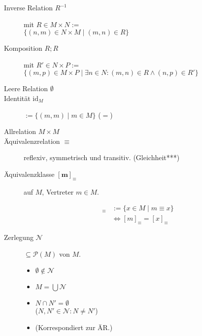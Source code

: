 \begin{mzImportant}
  \begin{description}
    \item [Inverse Relation $R^{-1}$]
          mit $R \in M \times N :=$ \\
          $\{ (n, m) \in N \times M \mid (m, n) \in R \}$

    \item [Komposition $R ; R$]
          mit $R' \in N \times P :=$ \\
          $\{ (m, p) \in M \times P \mid \exists n \in N: (m, n) \in R \land (n, p) \in R' \}$

    \item [Leere Relation $\emptyset$]

    \item [Identität $\text{id}_M$]
          $:= \{ (m,m) \mid m \in M \}$ ($=$)

    \item [Allrelation $M \times M$]

    \item [Äquivalenzrelation $\boldsymbol{\equiv}$]
          reflexiv, symmetrisch und transitiv. (Gleichheit***)

          \item[Äquivalenzklasse $\mathbf{[m]_\equiv}$]
          auf $M$, Vertreter $m \in M$.

          \begin{align*}
            [m]_\equiv & := \{ x \in M \mid m \equiv x \}        \\
                       & \Leftrightarrow [m]_\equiv = [x]_\equiv
          \end{align*}

    \item [Zerlegung $\boldsymbol{\mathcal{N}}$]
          $\subseteq \mathcal{P}(M)$ von $M$.

          \begin{itemize}
            \item $\emptyset \notin \mathcal{N}$
            \item $M = \bigcup \mathcal{N}$
            \item $N \cap N' = \emptyset$ \\
                  ($N, N' \in \mathcal{N}: N \neq N'$)
            \item (Korrespondiert zur ÄR.)
          \end{itemize}


\end{description}
\end{mzImportant}
